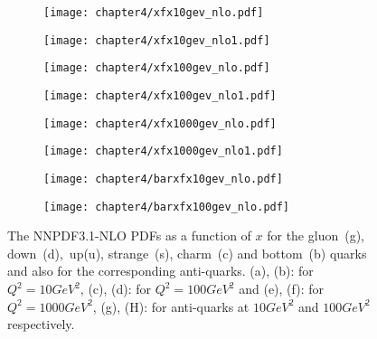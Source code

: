 \documentclass[a4paper,12pt]{report}
\numberwithin{equation}{section}
\begin{document}
\begin{figure}[H]
\centering
\begin{subfigure}{0.45\textwidth}
\texttt{[image: chapter4/xfx10gev\_nlo.pdf]}
\vspace*{-8mm}
\caption{}
\end{subfigure}
\begin{subfigure}{0.45\textwidth}
\texttt{[image: chapter4/xfx10gev\_nlo1.pdf]}
\vspace*{-8mm}
\caption{}
\end{subfigure}
\begin{subfigure}{0.45\textwidth}
\texttt{[image: chapter4/xfx100gev\_nlo.pdf]}
\vspace*{-8mm}
\caption{}
\end{subfigure}
\begin{subfigure}{0.45\textwidth}
\texttt{[image: chapter4/xfx100gev\_nlo1.pdf]}
\vspace*{-8mm}
\caption{}
\end{subfigure}
\begin{subfigure}{0.45\textwidth}
\texttt{[image: chapter4/xfx1000gev\_nlo.pdf]}
\vspace*{-8mm}
\caption{}
\end{subfigure}
\begin{subfigure}{0.45\textwidth}
\texttt{[image: chapter4/xfx1000gev\_nlo1.pdf]}
\vspace*{-8mm}
\caption{}
\end{subfigure}
\begin{subfigure}{0.45\textwidth}
\texttt{[image: chapter4/barxfx10gev\_nlo.pdf]}
\vspace*{-8mm}
\caption{}
\end{subfigure}
\begin{subfigure}{0.45\textwidth}
\texttt{[image: chapter4/barxfx100gev\_nlo.pdf]}
\vspace*{-8mm}
\caption{}
\end{subfigure}
\caption{The NNPDF3.1-NLO PDFs as a function of $x$ for the gluon~(g), down~(d),~up(u), strange~(s), charm~(c) and bottom~(b) quarks and also for the corresponding anti-quarks. (a), (b): for $Q^{2}= 10GeV^{2}$, (c), (d): for $Q^{2}=100GeV^{2}$ and (e), (f): for $Q^{2}=1000GeV^{2}$, (g), (H): for anti-quarks at $10GeV^{2}$ and $100GeV^{2}$ respectively.} 
\end{figure}
\end{document}
